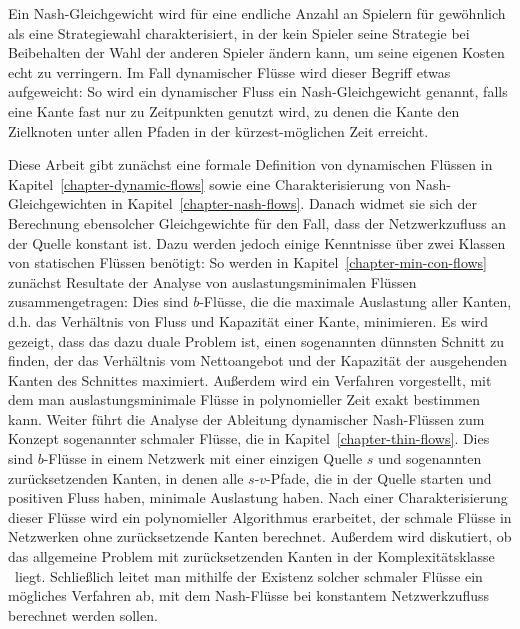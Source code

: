 Ein Nash-Gleichgewicht wird für eine endliche Anzahl an Spielern für gewöhnlich als eine Strategiewahl charakterisiert, in der kein Spieler seine Strategie bei Beibehalten der Wahl der anderen Spieler ändern kann, um seine eigenen Kosten echt zu verringern.
Im Fall dynamischer Flüsse wird dieser Begriff etwas aufgeweicht:
So wird ein dynamischer Fluss ein Nash-Gleichgewicht genannt, falls eine Kante 
fast nur zu Zeitpunkten genutzt wird, zu denen die Kante den Zielknoten unter allen Pfaden in der kürzest-möglichen Zeit erreicht.

Diese Arbeit gibt zunächst eine formale Definition von dynamischen Flüssen in Kapitel~\ref{chapter-dynamic-flows} sowie eine Charakterisierung von Nash-Gleichgewichten in Kapitel~\ref{chapter-nash-flows}.
Danach widmet sie sich der Berechnung ebensolcher Gleichgewichte für den Fall, dass der Netzwerkzufluss an der Quelle konstant ist.
Dazu werden jedoch einige Kenntnisse über zwei Klassen von statischen Flüssen benötigt:
So werden in Kapitel~\ref{chapter-min-con-flows} zunächst Resultate der Analyse von auslastungsminimalen Flüssen zusammengetragen:
Dies sind $b$-Flüsse, die die maximale Auslastung aller Kanten, d.h. das Verhältnis von Fluss und Kapazität einer Kante, minimieren.
Es wird gezeigt, dass das dazu duale Problem ist, einen sogenannten dünnsten Schnitt zu finden, der das Verhältnis vom Nettoangebot und der Kapazität der ausgehenden Kanten des Schnittes maximiert.
Außerdem wird ein Verfahren vorgestellt, mit dem man auslastungsminimale Flüsse in polynomieller Zeit exakt bestimmen kann.
Weiter führt die Analyse der Ableitung dynamischer Nash-Flüssen zum Konzept sogenannter schmaler Flüsse, die in Kapitel~\ref{chapter-thin-flows}.
Dies sind $b$-Flüsse in einem Netzwerk mit einer einzigen Quelle $s$ und sogenannten zurücksetzenden Kanten, in denen alle $s$-$v$-Pfade, die in der Quelle starten und positiven Fluss haben, minimale Auslastung haben.
Nach einer Charakterisierung dieser Flüsse wird ein polynomieller Algorithmus erarbeitet, der schmale Flüsse in Netzwerken ohne zurücksetzende Kanten berechnet.
Außerdem wird diskutiert, ob das allgemeine Problem mit zurücksetzenden Kanten in der Komplexitätsklasse \PPAD\ liegt.
Schließlich leitet man mithilfe der Existenz solcher schmaler Flüsse ein mögliches Verfahren ab, mit dem Nash-Flüsse bei konstantem Netzwerkzufluss berechnet werden sollen.
